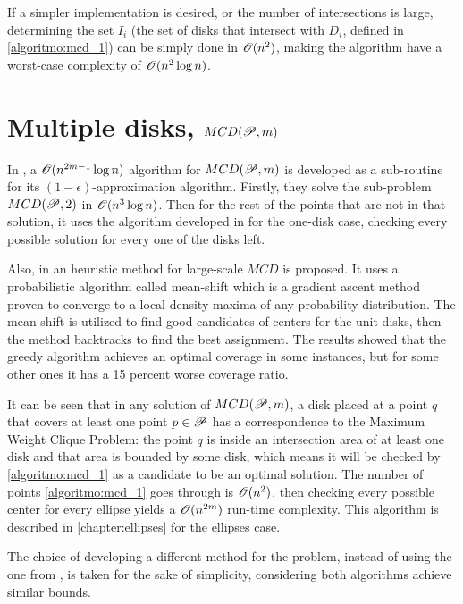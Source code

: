 If a simpler implementation is desired, or the number of intersections is large, determining the set $I_i$ (the set of disks that intersect with $D_i$, defined in \autoref{algoritmo:mcd_1}) can be simply done in $\mathscr{O}(n^2)$, making the algorithm have a worst-case complexity of $\mathscr{O}(n^2\log{n})$.

\section{Multiple disks, $MCD(\mathscr{P}, m)$}


In \cite{cabello:2006}, a $\mathscr{O}(n^{2m-1}\log{n})$ algorithm for $MCD(\mathscr{P}, m)$ is developed as a sub-routine for its $(1-\epsilon)$-approximation algorithm. Firstly, they solve the sub-problem $MCD(\mathscr{P}, 2)$ in $\mathscr{O}(n^3\log{n})$. Then for the rest of the points that are not in that solution, it uses the algorithm developed in \cite{chazelle:1986} for the one-disk case, checking every possible solution for every one of the disks left.

Also, in \cite{zhou} an heuristic method for large-scale $MCD$ is proposed. It uses a probabilistic algorithm called mean-shift which is a gradient ascent method proven to converge to a local density maxima of any probability distribution. The mean-shift is utilized to find good candidates of centers for the unit disks, then the method backtracks to find the best assignment. The results showed that the greedy algorithm achieves an optimal coverage in some instances, but for some other ones it has a 15 percent worse coverage ratio.
 
It can be seen that in any solution of $MCD(\mathscr{P}, m)$, a disk placed at a point $q$ that covers at least one point $p \in \mathscr{P}$ has a correspondence to the Maximum Weight Clique Problem: the point $q$ is inside an intersection area of at least one disk and that area is bounded by some disk, which means it will be checked by \autoref{algoritmo:mcd_1} as a candidate to be an optimal solution. The number of points \autoref{algoritmo:mcd_1} goes through is $\mathscr{O}(n^2)$, then checking every possible center for every ellipse yields a $\mathscr{O}(n^{2m})$ run-time complexity.
This algorithm is described in \autoref{chapter:ellipses} for the ellipses case.

The choice of developing a different method for the problem, instead of using the one from \cite{cabello:2006}, is taken for the sake of simplicity, considering both algorithms achieve similar bounds.